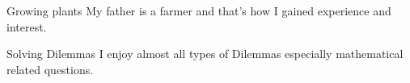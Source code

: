



\begin{cvskills}
  \cvskill
    {Growing plants} %
    {My father is a farmer and that's how I gained \newline experience and interest.}
    
  \cvskill
    {Solving Dilemmas} %
    {I enjoy almost all types of Dilemmas especially \newline mathematical related questions.} %

\end{cvskills}